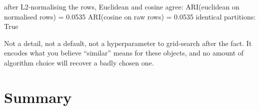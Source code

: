 \documentclass[11pt]{article}
\begin{document}
\begin{codeout}
after L2-normalising the rows, Euclidean and cosine agree:
  ARI(euclidean on normalised rows) = 0.0535
  ARI(cosine on raw rows)           = 0.0535
  identical partitions: True
\end{codeout}

\begin{keyidea}
Not a detail, not a default, not a hyperparameter to grid-search after the
fact. It encodes what you believe ``similar'' means for these objects, and no
amount of algorithm choice will recover a badly chosen one.
\end{keyidea}

\section{Summary}
\label{sec:summary}
\end{document}
